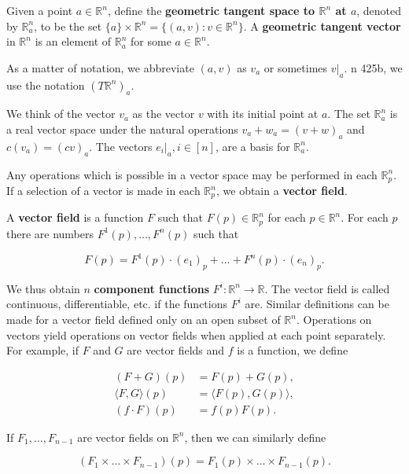 \begin{definition}\label{ra.def.tangent.space.lee}

Given a point \(a \in \mathbb{R}^n\), define the \textbf{geometric tangent space to \(\mathbb{R}^n\) at \(a\)}, denoted by \(\mathbb{R}^n_a\), to be the set \(\{a\} \times \mathbb{R}^n = \{(a,v): v \in \mathbb{R}^n\}\). A \textbf{geometric tangent vector} in \(\mathbb{R}^n\) is an element of \(\mathbb{R}^n_a\) for some \(a \in \mathbb{R}^n\). 

As a matter of notation, we abbreviate \((a,v)\) as \(v_a\) or sometimes \(v|_a\). n 425b, we use the notation \((T\mathbb{R}^n)_a\).

We think of the vector \(v_a\) as the vector \(v\) with its initial point at \(a\). The set \(\mathbb{R}^n_a\) is a real vector space under the natural operations \(v_a + w_a = (v+w)_a\) and \(c(v_a) = (cv)_a\). The vectors \(e_i |_a, i \in [n]\), are a basis for \(\mathbb{R}_a^n\). 

\end{definition}

Any operations which is possible in a vector space may be performed in each \(\mathbb{R}^n_p\). If a selection of a vector is made in each \(\mathbb{R}^n_p\), we obtain a \textbf{vector field}.

\begin{definition}\label{ra.def.vector.field}

A \textbf{vector field} is a function \(F\) such that \(F(p) \in \mathbb{R}^n_p\) for each \(p \in \mathbb{R}^n\). For each \(p\) there are numbers \(F^1(p), \ldots, F^n(p)\) such that 

\[
F(p) = F^1(p)\cdot (e_1)_p + \ldots + F^n(p) \cdot (e_n)_p.
\]

We thus obtain \(n\) \textbf{component functions} \(F^i: \mathbb{R}^n \to \mathbb{R}\). The vector field is called continuous, differentiable, etc. if the functions \(F^i\) are. Similar definitions can be made for a vector field defined only on an open subset of \(\mathbb{R}^n\). Operations on vectors yield operations on vector fields when applied at each point separately. For example, if \(F\) and \(G\) are vector fields and \(f\) is a function, we define 

\begin{align*}
(F+G)(p) & = F(p) + G(p), 
\\ \langle F, G \rangle (p) & = \langle F(p), G(p) \rangle,
\\ (f \cdot F)(p) & = f(p) F(p).
\end{align*}

If \(F_1, \ldots, F_{n-1}\) are vector fields on \(\mathbb{R}^n\), then we can similarly define 

\[
(F_1 \times \ldots \times F_{n-1})(p) = F_1(p) \times \ldots \times F_{n-1}(p).
\]

\end{definition}

